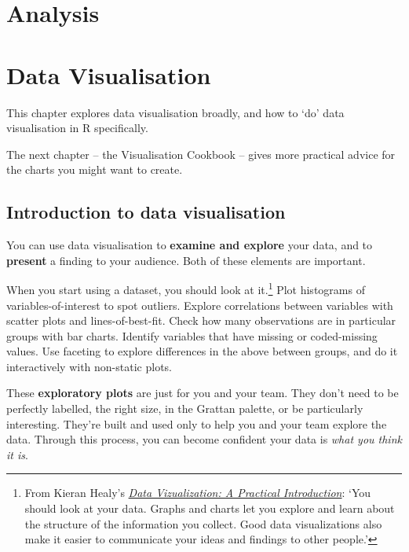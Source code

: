 \documentclass[]{book}
\let\rmarkdownfootnote\footnote%
\def\footnote{\protect\rmarkdownfootnote}
\begin{document}
\hypertarget{analysis}{%
\chapter{Analysis}\label{analysis}}

\hypertarget{data-visualisation}{%
\chapter{Data Visualisation}\label{data-visualisation}}

This chapter explores data visualisation broadly, and how to `do' data visualisation in R specifically.

The next chapter -- the Visualisation Cookbook -- gives more practical advice for the charts you might want to create.

\hypertarget{introduction-to-data-visualisation}{%
\section{Introduction to data visualisation}\label{introduction-to-data-visualisation}}

You can use data visualisation to \textbf{examine and explore} your data, and to \textbf{present} a finding to your audience. Both of these elements are important.

When you start using a dataset, you should look at it.\footnote{From Kieran Healy's \href{https://socviz.co/}{\emph{Data Vizualization: A Practical Introduction}}: `You should look at your data. Graphs and charts let you explore and learn about the structure of the information you collect. Good data visualizations also make it easier to communicate your ideas and findings to other people.'} Plot histograms of variables-of-interest to spot outliers. Explore correlations between variables with scatter plots and lines-of-best-fit. Check how many observations are in particular groups with bar charts. Identify variables that have missing or coded-missing values. Use faceting to explore differences in the above between groups, and do it interactively with non-static plots.

These \textbf{exploratory plots} are just for you and your team. They don't need to be perfectly labelled, the right size, in the Grattan palette, or be particularly interesting.
They're built and used only to help you and your team explore the data.
Through this process, you can become confident your data is \emph{what you think it is}.
\end{document}
